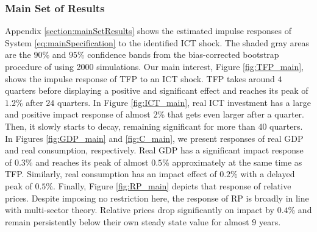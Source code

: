 \documentclass[12pt]{article}
\begin{document}
\subsubsection{Main Set of Results}

Appendix \ref{section:mainSetResults} shows the estimated impulse responses of System \ref{eq:mainSpecification} to the identified ICT shock. The shaded gray areas are the $90$\% and $95$\% confidence bands from the bias-corrected bootstrap procedure of \cite{kilian1998small} using 2000 simulations. Our main interest, Figure \ref{fig:TFP_main}, shows the impulse response of TFP to an ICT shock. TFP takes around $4$ quarters before displaying a positive and significant effect and reaches its peak of $1.2$\% after $24$ quarters. In Figure \ref{fig:ICT_main}, real ICT investment has a large and positive impact response of almost $2$\% that gets even larger after a quarter. Then, it slowly starts to decay, remaining significant for more than $40$ quarters. In Figures \ref{fig:GDP_main} and \ref{fig:C_main}, we present responses of real GDP and real consumption, respectively. Real GDP has a significant impact response of $0.3$\% and reaches its peak of almost $0.5$\% approximately at the same time as TFP. Similarly, real consumption has an impact effect of $0.2$\% with a delayed peak of $0.5$\%. Finally,  Figure \ref{fig:RP_main} depicts that response of relative prices. Despite imposing no restriction here, the response of RP is broadly in line with multi-sector theory. Relative prices drop significantly on impact by $0.4$\% and remain persistently below their own steady state value for almost $9$ years.
\end{document}
